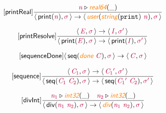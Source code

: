 \documentclass[10pt,leqno,fleqn]{article}
\newcommand{\artVariable}[1]{\mbox{\color{purple}\em #1\/}}
\newcommand{\artConstructor}[1]{\mbox{\sf #1}}
\newcommand{\artCaseInsensitiveLiteral}[1]{\mbox{\tt #1}}
\newcommand{\artSpecial}[1]{\mbox{\color{orange}\sf\em #1}}
\begin{document}
\begin{equation}
\tag*{[\artConstructor{\sf printReal}]}
\begin{split}\frac{ \artVariable{n}\triangleright \artSpecial{real64}(\_) }{\langle\, \artConstructor{\sf print}(\artVariable{n}), \artVariable{$\sigma$}\,\rangle \rightarrow \langle\, \artSpecial{user}(\artSpecial{string}(\artCaseInsensitiveLiteral{print})\ \artVariable{n}), \artVariable{$\sigma$}\,\rangle }
\end{split}
\end{equation}

\begin{equation}
\tag*{[\artConstructor{\sf printResolve}]}
\begin{split}\frac{\langle\, \artVariable{E}, \artVariable{$\sigma$}\,\rangle \rightarrow \langle\, \artVariable{I}, \artVariable{$\sigma$\/$^\prime$}\,\rangle }{\langle\, \artConstructor{\sf print}(\artVariable{E}), \artVariable{$\sigma$}\,\rangle \rightarrow \langle\, \artConstructor{\sf print}(\artVariable{I}), \artVariable{$\sigma$\/$^\prime$}\,\rangle }
\end{split}
\end{equation}

\begin{equation}
\tag*{[\artConstructor{\sf sequenceDone}]}
\begin{split}\langle\, \artConstructor{\sf seq}(\artSpecial{done}\ \artVariable{C}), \artVariable{$\sigma$}\,\rangle \rightarrow \langle\, \artVariable{C}, \artVariable{$\sigma$}\,\rangle 
\end{split}
\end{equation}

\begin{equation}
\tag*{[\artConstructor{\sf sequence}]}
\begin{split}\frac{\langle\, \artVariable{C$_{1}$}, \artVariable{$\sigma$}\,\rangle \rightarrow \langle\, \artVariable{C$_{1}$\/$^\prime$}, \artVariable{$\sigma$\/$^\prime$}\,\rangle }{\langle\, \artConstructor{\sf seq}(\artVariable{C$_{1}$}\ \artVariable{C$_{2}$}), \artVariable{$\sigma$}\,\rangle \rightarrow \langle\, \artConstructor{\sf seq}(\artVariable{C$_{1}$\/$^\prime$}\ \artVariable{C$_{2}$}), \artVariable{$\sigma$\/$^\prime$}\,\rangle }
\end{split}
\end{equation}

\begin{equation}
\tag*{[\artConstructor{\sf divInt}]}
\begin{split}\frac{ \artVariable{n$_{1}$}\triangleright \artSpecial{int32}(\_) \quad  \artVariable{n$_{2}$}\triangleright \artSpecial{int32}(\_) }{\langle\, \artConstructor{\sf div}(\artVariable{n$_{1}$}\ \artVariable{n$_{2}$}), \artVariable{$\sigma$}\,\rangle \rightarrow \langle\, \artSpecial{div}(\artVariable{n$_{1}$}\ \artVariable{n$_{2}$}), \artVariable{$\sigma$}\,\rangle }
\end{split}
\end{equation}
\end{document}
